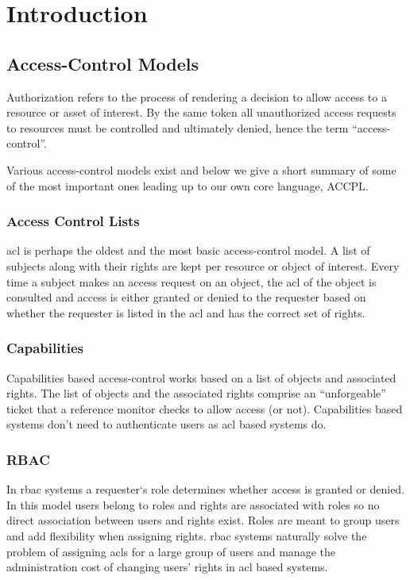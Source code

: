 \chapter{Introduction}


\section{Access-Control Models~\cite{nist}}
Authorization refers to the process of rendering a decision to allow access to a resource or asset of interest. By the same token all unauthorized access requests to resources must be controlled and ultimately denied, hence the term ``access-control''. 

Various access-control models exist and below we give a short summary of some of the most important ones leading up to our own core language, \ac{ACCPL}.

\subsection{Access Control Lists}

\ac{acl} is perhaps the oldest and the most basic access-control model. A list of subjects along with their rights are kept per resource or object of interest. Every time a subject makes an access request on an object, the \ac{acl} of the object is consulted and access is either granted or denied to the requester based on whether the requester is listed in the \ac{acl} and has the correct set of rights.

\subsection{Capabilities}
Capabilities based access-control works based on a list of objects and associated rights. The list of objects and the associated rights comprise an ``unforgeable'' ticket that a reference monitor checks to allow access (or not). Capabilities based systems don't need to authenticate users as \ac{acl} based systems do.

\subsection{RBAC}

In \ac{rbac} systems a requester`s role determines whether access is granted or denied. In this model users belong to roles and rights are associated with roles so no direct association between users and rights exist. Roles are meant to group users and add flexibility when assigning rights. \ac{rbac} systems naturally solve the problem of assigning \ac{acl}s for a large group of users and manage the administration cost of changing users' rights in \ac{acl} based systems.

